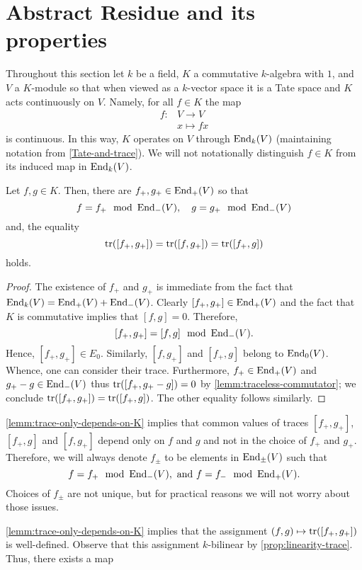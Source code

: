 \section{Abstract Residue and its properties}
Throughout this section let $k$ be a field, $K$ a commutative $k$-algebra with $1$, and $V$ a $K$-module so that when viewed as a $k$-vector space it is a Tate space and $K$ acts continuously on $V$. Namely, for all $f \in K$ the map 
\begin{align*}
	f\colon &V \to V \\
	&x \mapsto fx 
\end{align*}
is continuous. In this way, $K$ operates on $V$ through $\operatorname{End}_{k}(V)$ (maintaining notation from \cref{Tate-and-trace}). We will not notationally distinguish $f\in K$ from its induced map in $\operatorname{End}_{k}(V)$.
\begin{lemma}\label{lemm:trace-only-depends-on-K}
	Let $f,g \in K$. Then, there are $f_{+}, g_{+} \in \operatorname{End}_{+}(V)$ so that 
	\[
	f = f_{+} \mod {\operatorname{End}}_{-}(V) ,\quad g = g_{+} \mod {\operatorname{End}}_{-}(V)
	\]
	and, the equality
	\[
		\operatorname{tr}([f_{+},g_{+}]) = \operatorname{tr}([f, g_{+}]) = \operatorname{tr}([f_{+}, g])
	\]
	holds.
\end{lemma}
\begin{proof}
The existence of $f_{+}$ and $g_{+}$ is immediate from the fact that $\operatorname{End}_{k}(V) = \operatorname{End}_{+}(V) + \operatorname{End}_{-}(V)$.  Clearly $[f_{+},g_{+}]\in \operatorname{End}_{+}(V)$ and the fact that $K$ is commutative implies that $[f,g] = 0$. Therefore,
\[
	[f_{+},g_{+}] = [f,g] \mod {\operatorname{End}}_{-}(V).
\]
Hence, $[f_{+},g_{+}]\in E_0$. Similarly, $[f,g_{+}]$ and $[f_{+}, g]$ belong to $\operatorname{End}_{0}(V)$. Whence, one can consider their trace. Furthermore, $f_{+} \in \operatorname{End}_{+}(V)$ and $g_{+} - g \in \operatorname{End}_{-}(V)$ thus $\operatorname{tr}([f_{+}, g_{+} - g]) = 0$ by \cref{lemm:traceless-commutator}; we conclude $\operatorname{tr}([f_{+}, g_{+}]) = \operatorname{tr}([f_{+}, g])$. The other equality follows similarly.
\end{proof}
\begin{notation}\label{not:plus-and-minus}
	\cref{lemm:trace-only-depends-on-K} implies that common values of traces $[f_{+},g_{+}]$, $[f_{+}, g]$ and $[f, g_{+}]$ depend only on $f$ and $g$ and not in the choice of $f_{+}$ and $g_{+}$. Therefore, we will always denote $f_{\pm}$ to be elements in $\operatorname{End}_{\pm}(V)$ such that
	\[
		f = f_{+} \mod {\operatorname{End}}_{-}(V) ,\text{ and } f = f_{-} \mod {\operatorname{End}}_{+}(V).
	\] 
	Choices of $f_{\pm}$ are not unique, but for practical reasons we will not worry about those issues. 
\end{notation}
\cref{lemm:trace-only-depends-on-K} implies that the assignment $(f,g) \mapsto \operatorname{tr}([f_{+}, g_{+}])$  is well-defined. Observe that this assignment $k$-bilinear by \cref{prop:linearity-trace}. Thus, there exists a map

